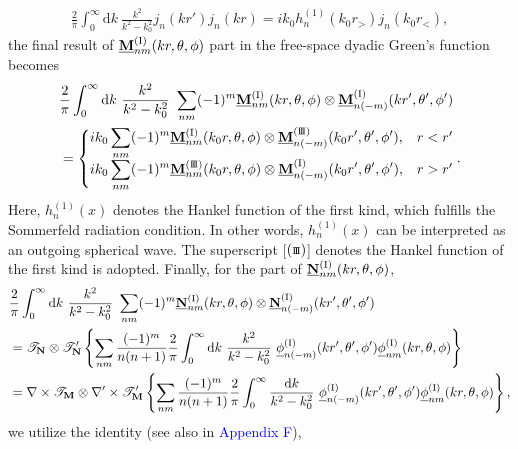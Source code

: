 \documentclass[journal=jacsat,manuscript=article,layout=traditional]{achemso}
\newcommand*\diff{\mathrm{d}}
\newcommand*\blue[1]{\textcolor{blue}{#1}}
\newcommand{\norF}[1]{\underline{\vb{#1}}}
\newcommand{\joinR}{\hspace{-.17em}}
\newcommand{\RomanI}{\scriptsize\textrm{I}}
\newcommand{\RomanIII}{\mbox{\RomanI\joinR\RomanI\joinR\RomanI}}
\begin{document}
\begin{align}
    \label{Eq:ContourIntM}
    \frac{2}{\pi}\int_0^\infty\diff{k}~\frac{k^2}{k^2-k_0^2}
    j_n(kr')j_n(kr)=ik_0h_n^{(1)}(k_0r_>)j_n(k_0r_<),
\end{align}
the final result of $\norF{M}_{nm}^{(\RomanI)}(kr,\theta,\phi)$ part in the free-space dyadic Green's function becomes
\begin{align}
    \nonumber
    &\frac{2}{\pi}\int_0^{\infty}\diff{k}~\frac{k^2}{k^2-k_0^2}~\sum_{nm}(-1)^m
    \norF{M}_{nm}^{(\RomanI)}(kr,\theta,\phi)\otimes
    \norF{M}_{n(-m)}^{(\RomanI)}(kr',\theta',\phi')\\
    &=\begin{cases}
    \displaystyle
    ik_0  \sum_{nm}(-1)^m \norF{M}_{nm}^{(\RomanI)}(k_0r,\theta,\phi)\otimes
    \norF{M}_{n(-m)}^{(\RomanIII)}(k_0r',\theta',\phi'),  & r<r'\\
    \displaystyle
    ik_0  \sum_{nm}(-1)^m \norF{M}_{nm}^{(\RomanIII)}(k_0r,\theta,\phi)\otimes
    \norF{M}_{n(-m)}^{(\RomanI)}(k_0r',\theta',\phi'),  & r>r'\\
    \end{cases}.
\end{align}
Here, $h_n^{(1)}(x)$ denotes the Hankel function of the first kind, which fulfills the Sommerfeld radiation condition.
In other words, $h_n^{(1)}(x)$ can be interpreted as an outgoing spherical wave.
The superscript [$(\RomanIII)$] denotes the Hankel function of the first kind is adopted.
Finally, for the part of $\norF{N}_{nm}^{(\RomanI)}(kr,\theta,\phi)$,
\begin{align}
    \nonumber
    &\frac{2}{\pi}\int_0^{\infty}\diff{k}~\frac{k^2}{k^2-k_0^2}~\sum_{nm}(-1)^m
    \norF{N}_{nm}^{(\RomanI)}(kr,\theta,\phi) \otimes
    \norF{N}_{n(-m)}^{(\RomanI)}(kr',\theta',\phi')\\
    \nonumber
    &=
    \mathcal{T}_{\vb{N}}\otimes\mathcal{T}_{\vb{N}}'
    \left\{\sum_{nm}\frac{(-1)^m}{n(n+1)}
    \frac{2}{\pi}\int_0^{\infty}\diff{k}~\frac{k^2}{k^2-k_0^{2}}~
    \underline{\phi}_{n(-m)}^{(\RomanI)}(kr',\theta',\phi')\underline{\phi}_{nm}^{(\RomanI)}(kr,\theta,\phi)\right\}\\
    &=
    \nabla\times\mathcal{T}_{\vb{M}}\otimes\nabla'\times\mathcal{T}_{\vb{M}}'
    \left\{\sum_{nm}\frac{(-1)^m}{n(n+1)}\frac{2}{\pi}\int_0^{\infty}\frac{\diff{k}}{k^2-k_0^{2}}~
    \underline{\phi}_{n(-m)}^{(\RomanI)}(kr',\theta',\phi')\underline{\phi}_{nm}^{(\RomanI)}(kr,\theta,\phi)\right\},
\end{align}
we utilize the identity (see also in \blue{Appendix F}),
\end{document}
